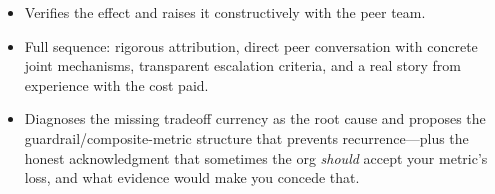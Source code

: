 \begin{interviewq}

\goodgreat
\begin{itemize}
    \item {} Verifies the effect and raises it constructively with the peer team.
    \item {} Full sequence: rigorous attribution, direct peer conversation with concrete joint mechanisms, transparent escalation criteria, and a real story from experience with the cost paid.
    \item {} Diagnoses the missing tradeoff currency as the root cause and proposes the guardrail/composite-metric structure that prevents recurrence---plus the honest acknowledgment that sometimes the org \textit{should} accept your metric's loss, and what evidence would make you concede that.
\end{itemize}

\end{interviewq}


